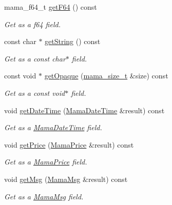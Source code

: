 \begin{DoxyCompactItemize}
mama\_\-f64\_\-t \hyperlink{classWombat_1_1MamaMsgField_ad7d22896ab2dfd6e46de353fb98ee418}{getF64} () const 
\begin{DoxyCompactList}\small\item\em Get as a f64 field. \item\end{DoxyCompactList}\item 
const char $\ast$ \hyperlink{classWombat_1_1MamaMsgField_a9e7638cfd9b45e2cfd4c600c03beec95}{getString} () const 
\begin{DoxyCompactList}\small\item\em Get as a const char$\ast$ field. \item\end{DoxyCompactList}\item 
const void $\ast$ \hyperlink{classWombat_1_1MamaMsgField_a59563f50a3498e338685b0c2ebc0526b}{getOpaque} (\hyperlink{classmama__size__t}{mama\_\-size\_\-t} \&size) const 
\begin{DoxyCompactList}\small\item\em Get as a const void$\ast$ field. \item\end{DoxyCompactList}\item 
void \hyperlink{classWombat_1_1MamaMsgField_a2be713355da30ba739b83c391e229323}{getDateTime} (\hyperlink{classWombat_1_1MamaDateTime}{MamaDateTime} \&result) const 
\begin{DoxyCompactList}\small\item\em Get as a \hyperlink{classWombat_1_1MamaDateTime}{MamaDateTime} field. \item\end{DoxyCompactList}\item 
void \hyperlink{classWombat_1_1MamaMsgField_ad10995763db86d09ba98e6a6fe17e4aa}{getPrice} (\hyperlink{classWombat_1_1MamaPrice}{MamaPrice} \&result) const 
\begin{DoxyCompactList}\small\item\em Get as a \hyperlink{classWombat_1_1MamaPrice}{MamaPrice} field. \item\end{DoxyCompactList}\item 
void \hyperlink{classWombat_1_1MamaMsgField_ad072efdd93ea32ab5a7f80dda1cfdb8b}{getMsg} (\hyperlink{classWombat_1_1MamaMsg}{MamaMsg} \&result) const 
\begin{DoxyCompactList}\small\item\em Get as a \hyperlink{classWombat_1_1MamaMsg}{MamaMsg} field. \item\end{DoxyCompactList}\item 

\end{DoxyCompactItemize}
